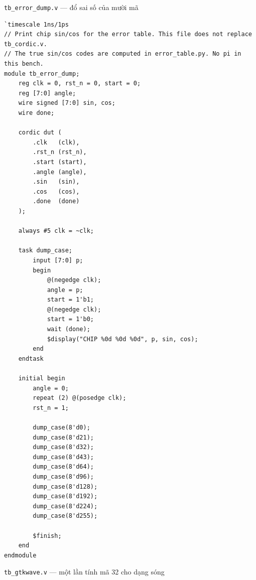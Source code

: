 \documentclass[12pt,a4paper]{article}
\begin{document}
\noindent\texttt{tb\_error\_dump.v} — đổ sai số của mười mã

\begin{verbatim}
`timescale 1ns/1ps
// Print chip sin/cos for the error table. This file does not replace tb_cordic.v.
// The true sin/cos codes are computed in error_table.py. No pi in this bench.
module tb_error_dump;
    reg clk = 0, rst_n = 0, start = 0;
    reg [7:0] angle;
    wire signed [7:0] sin, cos;
    wire done;

    cordic dut (
        .clk   (clk),
        .rst_n (rst_n),
        .start (start),
        .angle (angle),
        .sin   (sin),
        .cos   (cos),
        .done  (done)
    );

    always #5 clk = ~clk;

    task dump_case;
        input [7:0] p;
        begin
            @(negedge clk);
            angle = p;
            start = 1'b1;
            @(negedge clk);
            start = 1'b0;
            wait (done);
            $display("CHIP %0d %0d %0d", p, sin, cos);
        end
    endtask

    initial begin
        angle = 0;
        repeat (2) @(posedge clk);
        rst_n = 1;

        dump_case(8'd0);
        dump_case(8'd21);
        dump_case(8'd32);
        dump_case(8'd43);
        dump_case(8'd64);
        dump_case(8'd96);
        dump_case(8'd128);
        dump_case(8'd192);
        dump_case(8'd224);
        dump_case(8'd255);

        $finish;
    end
endmodule
\end{verbatim}

\noindent\texttt{tb\_gtkwave.v} — một lần tính mã 32 cho dạng sóng
\end{document}
